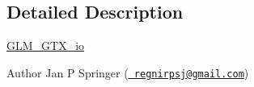 \subsection{Detailed Description}
\mbox{\hyperlink{group__gtx__io}{G\+L\+M\+\_\+\+G\+T\+X\+\_\+io}}

\begin{DoxyAuthor}{Author}
Jan P Springer (\href{mailto:regnirpsj@gmail.com}{\texttt{ regnirpsj@gmail.\+com}}) 
\end{DoxyAuthor}
